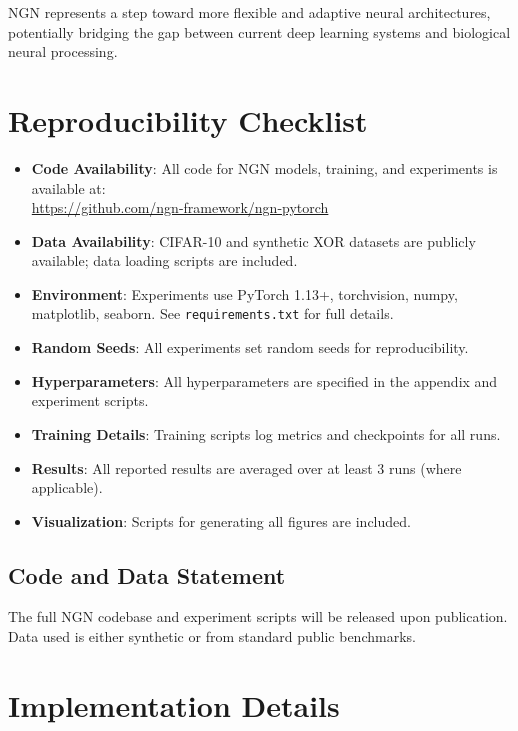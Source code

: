 \documentclass[11pt]{article}
\begin{document}
NGN represents a step toward more flexible and adaptive neural architectures, potentially bridging the gap between current deep learning systems and biological neural processing.




\appendix

\section{Reproducibility Checklist}

\begin{itemize}
    \item \textbf{Code Availability}: All code for NGN models, training, and experiments is available at: \\ \url{https://github.com/ngn-framework/ngn-pytorch}
    \item \textbf{Data Availability}: CIFAR-10 and synthetic XOR datasets are publicly available; data loading scripts are included.
    \item \textbf{Environment}: Experiments use PyTorch 1.13+, torchvision, numpy, matplotlib, seaborn. See \texttt{requirements.txt} for full details.
    \item \textbf{Random Seeds}: All experiments set random seeds for reproducibility.
    \item \textbf{Hyperparameters}: All hyperparameters are specified in the appendix and experiment scripts.
    \item \textbf{Training Details}: Training scripts log metrics and checkpoints for all runs.
    \item \textbf{Results}: All reported results are averaged over at least 3 runs (where applicable).
    \item \textbf{Visualization}: Scripts for generating all figures are included.
\end{itemize}

\subsection{Code and Data Statement}
The full NGN codebase and experiment scripts will be released upon publication. Data used is either synthetic or from standard public benchmarks.

\section{Implementation Details}
\end{document}
